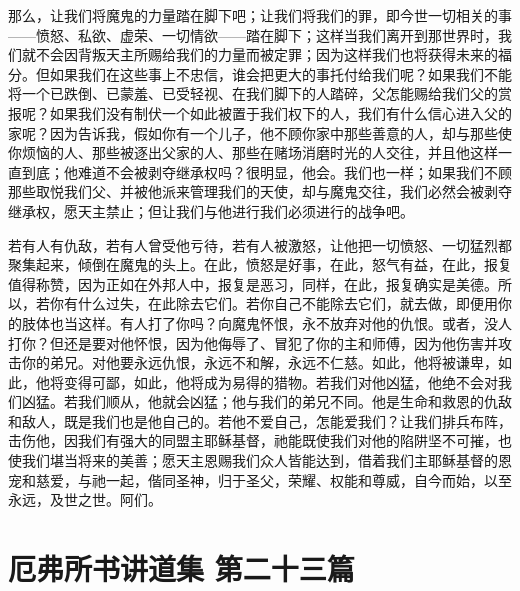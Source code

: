 那么，让我们将魔鬼的力量踏在脚下吧；让我们将我们的罪，即今世一切相关的事——愤怒、私欲、虚荣、一切情欲——踏在脚下；这样当我们离开到那世界时，我们就不会因背叛天主所赐给我们的力量而被定罪；因为这样我们也将获得未来的福分。但如果我们在这些事上不忠信，谁会把更大的事托付给我们呢？如果我们不能将一个已跌倒、已蒙羞、已受轻视、在我们脚下的人踏碎，父怎能赐给我们父的赏报呢？如果我们没有制伏一个如此被置于我们权下的人，我们有什么信心进入父的家呢？因为告诉我，假如你有一个儿子，他不顾你家中那些善意的人，却与那些使你烦恼的人、那些被逐出父家的人、那些在赌场消磨时光的人交往，并且他这样一直到底；他难道不会被剥夺继承权吗？很明显，他会。我们也一样；如果我们不顾那些取悦我们父、并被他派来管理我们的天使，却与魔鬼交往，我们必然会被剥夺继承权，愿天主禁止；但让我们与他进行我们必须进行的战争吧。\par

若有人有仇敌，若有人曾受他亏待，若有人被激怒，让他把一切愤怒、一切猛烈都聚集起来，倾倒在魔鬼的头上。在此，愤怒是好事，在此，怒气有益，在此，报复值得称赞，因为正如在外邦人中，报复是恶习，同样，在此，报复确实是美德。所以，若你有什么过失，在此除去它们。若你自己不能除去它们，就去做，即便用你的肢体也当这样。有人打了你吗？向魔鬼怀恨，永不放弃对他的仇恨。或者，没人打你？但还是要对他怀恨，因为他侮辱了、冒犯了你的主和师傅，因为他伤害并攻击你的弟兄。对他要永远仇恨，永远不和解，永远不仁慈。如此，他将被谦卑，如此，他将变得可鄙，如此，他将成为易得的猎物。若我们对他凶猛，他绝不会对我们凶猛。若我们顺从，他就会凶猛；他与我们的弟兄不同。他是生命和救恩的仇敌和敌人，既是我们也是他自己的。若他不爱自己，怎能爱我们？让我们排兵布阵，击伤他，因我们有强大的同盟主耶稣基督，祂能既使我们对他的陷阱坚不可摧，也使我们堪当将来的美善；愿天主恩赐我们众人皆能达到，借着我们主耶稣基督的恩宠和慈爱，与祂一起，偕同圣神，归于圣父，荣耀、权能和尊威，自今而始，以至永远，及世之世。阿们。\par



\section{厄弗所书讲道集 第二十三篇}

\par

